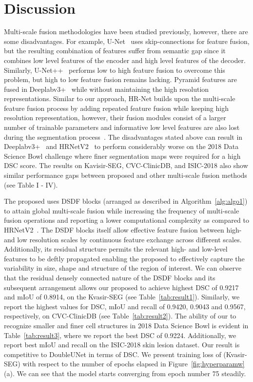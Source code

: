 \documentclass[journal,twoside,web]{IEEEtran}
\newcommand{\sysname}{\text{MSRF-Net}\xspace}
\begin{document}
\section{Discussion}
Multi-scale fusion methodologies have been studied previously, however, there are some disadvantages. For example, U-Net~\cite{ronneberger2015u} uses skip-connections for feature fusion, but the resulting combination of features suffer from semantic gap since it combines low level features of the encoder and high level features of the decoder. Similarly, U-Net++~\cite{zhou2019unet++} performs low to high feature fusion to overcome this problem, but high to low feature fusion remains lacking. Pyramid features are fused in Deeplabv3+~\cite{chen2018encoder} while without maintaining the high resolution representations. Similar to our approach, HR-Net builds upon the multi-scale feature fusion process by adding repeated feature fusion while keeping high resolution representation, however, their fusion modules consist of a larger number of trainable parameters and informative low level features are also lost during the segmentation process~\cite{xu2021hrcnet}. 
The disadvantages stated above can result in Deeplabv3+~\cite{chen2018encoder} and HRNetV2~\cite{wang2020deep} to perform considerably worse on the 2018 Data Science Bowl challenge where finer segmentation maps were required for a high \ac{DSC} score. The results on Kavisir-SEG, CVC-ClinicDB, and ISIC-2018 also show similar performance gaps between proposed and other multi-scale fusion methods (see Table I - IV). 

The proposed \sysname uses \ac{DSDF} blocks (arranged as described in Algorithm~\ref{alg:algo1}) to attain global multi-scale fusion while increasing the frequency of multi-scale fusion operations and reporting a lower computational complexity as compared to HRNetV2~\cite{wang2020deep}. The \ac{DSDF} blocks itself allow effective feature fusion between high- and low resolution scales by continuous feature exchange across different scales. Additionally, its residual structure permits the relevant high- and low-level features to be deftly propagated enabling the proposed \sysname to effectively capture the variability in size, shape and structure of the region of interest. We can observe that the residual densely connected nature of the \ac{DSDF} blocks and its subsequent arrangement allows our proposed \sysname to achieve highest \ac{DSC} of 0.9217 and \ac{mIoU} of 0.8914,  on the Kvasir-SEG (see Table~\ref{tab:result1}). Similarly, we report the highest values for \ac{DSC}, \ac{mIoU} and recall of 0.9420, 0.9043 and 0.9567, respectively, on CVC-ClinicDB (see Table~\ref{tab:result2}). The ability of our \sysname to recognize smaller and finer cell structures in 2018 Data Science Bowl is evident in Table~\ref{tab:result3}, where we report the best \ac{DSC} of 0.9224. Additionally, we  report best \ac{mIoU} and recall on the ISIC-2018 skin lesion dataset. Our result is competitive to DoubleUNet in terms of \ac{DSC}. We present training loss of \sysname (Kvasir-SEG) with respect to the number of epochs elapsed in Figure~\ref{fig:hyperparamw}(a). We can see that the model starts converging from epoch number 75 steadily.
\end{document}
